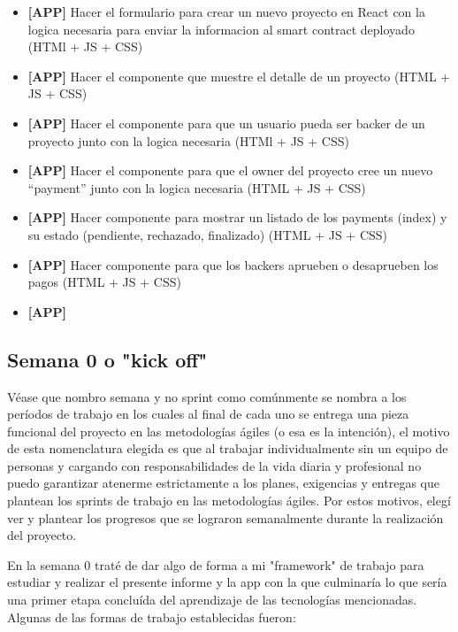 \begin{itemize}
\item \textbf{[APP]} Hacer el formulario para crear un nuevo proyecto en React con la logica
necesaria para enviar la informacion al smart contract deployado (HTMl + JS + CSS)
\item \textbf{[APP]} Hacer el componente que muestre el detalle de un proyecto (HTML + JS + CSS)
\item \textbf{[APP]} Hacer el componente para que un usuario pueda ser backer de un proyecto junto
con la logica necesaria (HTMl + JS + CSS)
\item \textbf{[APP]} Hacer el componente para que el owner del proyecto cree un nuevo “payment”
junto con la logica necesaria (HTML + JS + CSS)
\item \textbf{[APP]} Hacer componente para mostrar un listado de los payments (index) y su estado
(pendiente, rechazado, finalizado) (HTML + JS + CSS)
\item \textbf{[APP]} Hacer componente para que los backers aprueben o desaprueben los pagos (HTML +
 JS + CSS)
\item \textbf{[APP]}

\end{itemize}

\subsection{Semana 0 o "kick off"}
Véase que nombro semana y no sprint como comúnmente se nombra a los períodos de trabajo en los 
cuales al final de cada uno se entrega una pieza funcional del proyecto en las metodologías ágiles
(o esa es la intención), el motivo de esta nomenclatura elegida es que al trabajar individualmente 
sin un equipo de personas y cargando con responsabilidades de la vida diaria y profesional no puedo
garantizar atenerme estrictamente a los planes, exigencias y entregas que plantean los sprints de 
trabajo en las metodologías ágiles. Por estos motivos, elegí ver y plantear los progresos que se 
lograron semanalmente durante la realización del proyecto.

En la semana 0 traté de dar algo de forma a mi "framework" de trabajo para estudiar
y realizar el presente informe y la app con la que culminaría lo que sería una primer etapa
concluída del aprendizaje de las tecnologías mencionadas. Algunas de las formas de trabajo 
establecidas fueron:

